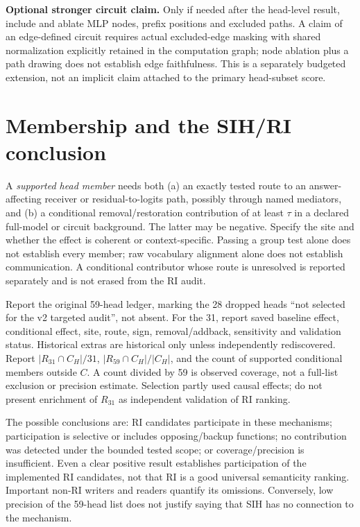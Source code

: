 \documentclass[11pt,a4paper]{article}
\newcommand{\Rtest}{R_{59}}
\begin{document}
\textbf{Optional stronger circuit claim.} Only if needed after the head-level result,
include and ablate MLP nodes, prefix positions and excluded paths. A claim of an
edge-defined circuit requires actual excluded-edge masking with shared normalization
explicitly retained in the computation graph; node ablation plus a path drawing does
not establish edge faithfulness. This is a separately budgeted extension, not an
implicit claim attached to the primary head-subset score.

\section{Membership and the SIH/RI conclusion}
\label{sec:membership}
A \emph{supported head member} needs both (a) an exactly tested route to an answer-
affecting receiver or residual-to-logits path, possibly through named mediators,
and (b) a conditional removal/restoration contribution of at least $\tau$ in a
declared full-model or circuit background. The latter may be negative. Specify the
site and whether the effect is coherent or context-specific. Passing a group test
alone does not establish every member; raw vocabulary alignment alone does not
establish communication. A conditional contributor whose route is unresolved is
reported separately and is not erased from the RI audit.

Report the original 59-head ledger, marking the 28 dropped heads ``not selected
for the v2 targeted audit'', not absent. For the 31, report saved baseline effect,
conditional effect, site, route, sign, removal/addback, sensitivity and validation
status. Historical extras are historical only unless independently rediscovered.
Report $|R_{31}\cap C_H|/31$, $|\Rtest\cap C_H|/|C_H|$, and the count of supported
conditional members outside $C$. A count divided by 59 is observed coverage, not a
full-list exclusion or precision estimate. Selection partly used causal effects;
do not present enrichment of $R_{31}$ as independent validation of RI ranking.

The possible conclusions are: RI candidates participate in these mechanisms;
participation is selective or includes opposing/backup functions; no contribution
was detected under the bounded tested scope; or coverage/precision is insufficient.
Even a clear positive result establishes participation of the implemented RI
candidates, not that RI is a good universal semanticity ranking. Important non-RI
writers and readers quantify its omissions. Conversely, low precision of the
59-head list does not justify saying that SIH has no connection to the mechanism.
\end{document}
